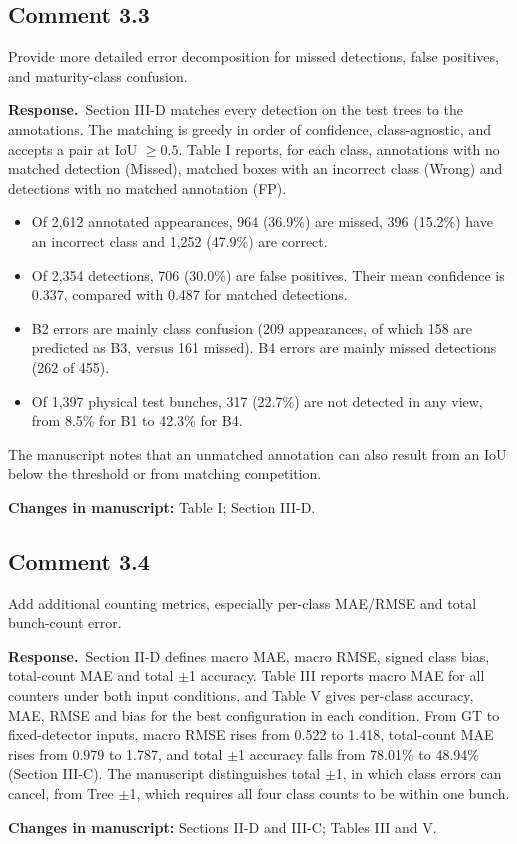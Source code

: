 \documentclass[10pt,a4paper]{article}
\newcommand{\resp}{\textbf{Response.}\ }
\newcommand{\changes}[1]{\par\textbf{Changes in manuscript:} #1}
\begin{document}
\subsection{Comment 3.3}
\begin{cmt}
Provide more detailed error decomposition for missed detections, false positives, and
maturity-class confusion.
\end{cmt}
\resp Section III-D matches every detection on the test trees to the annotations. The
matching is greedy in order of confidence, class-agnostic, and accepts a pair at
IoU $\geq 0.5$. Table I reports, for each class, annotations with no matched detection
(Missed), matched boxes with an incorrect class (Wrong) and detections with no matched
annotation (FP).
\begin{itemize}
\item Of 2,612 annotated appearances, 964 (36.9\%) are missed, 396 (15.2\%) have an
  incorrect class and 1,252 (47.9\%) are correct.
\item Of 2,354 detections, 706 (30.0\%) are false positives. Their mean confidence is
  0.337, compared with 0.487 for matched detections.
\item B2 errors are mainly class confusion (209 appearances, of which 158 are predicted
  as B3, versus 161 missed). B4 errors are mainly missed detections (262 of 455).
\item Of 1,397 physical test bunches, 317 (22.7\%) are not detected in any view, from
  8.5\% for B1 to 42.3\% for B4.
\end{itemize}
The manuscript notes that an unmatched annotation can also result from an IoU below the
threshold or from matching competition.
\changes{Table I; Section III-D.}

\subsection{Comment 3.4}
\begin{cmt}
Add additional counting metrics, especially per-class MAE/RMSE and total bunch-count
error.
\end{cmt}
\resp Section II-D defines macro MAE, macro RMSE, signed class bias, total-count MAE and
total $\pm$1 accuracy. Table III reports macro MAE for all counters under both input
conditions, and Table V gives per-class accuracy, MAE, RMSE and bias for the best
configuration in each condition. From GT to fixed-detector inputs, macro RMSE rises
from 0.522 to 1.418, total-count MAE rises from 0.979 to 1.787, and total $\pm$1
accuracy falls from 78.01\% to 48.94\% (Section III-C). The manuscript distinguishes
total $\pm$1, in which class errors can cancel, from Tree $\pm$1, which requires all
four class counts to be within one bunch.
\changes{Sections II-D and III-C; Tables III and V.}
\end{document}
